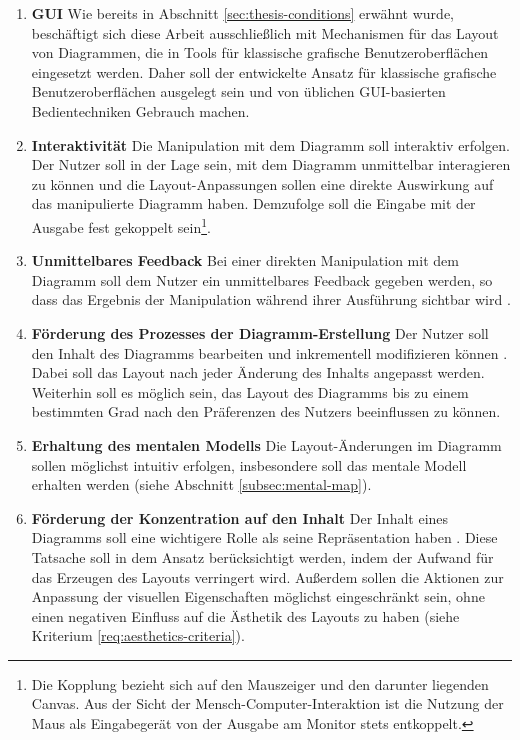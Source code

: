 \begin{enumerate}[label={K.\arabic*}]

\item
\label{req:gui}
\textbf{GUI}
Wie bereits in Abschnitt \ref{sec:thesis-conditions} erwähnt wurde, beschäftigt sich diese Arbeit ausschließlich mit Mechanismen für das Layout von Diagrammen, die in Tools für klassische grafische Benutzeroberflächen eingesetzt werden. Daher soll der entwickelte Ansatz für klassische grafische Benutzeroberflächen ausgelegt sein und von üblichen GUI-basierten Bedientechniken Gebrauch machen.

\item
\label{req:interactivity}
\textbf{Interaktivität}
Die Manipulation mit dem Diagramm soll interaktiv erfolgen. Der Nutzer soll in der Lage sein, mit dem Diagramm unmittelbar interagieren zu können und die Layout-Anpassungen sollen eine direkte Auswirkung auf das manipulierte Diagramm haben. Demzufolge soll die Eingabe mit der Ausgabe fest gekoppelt sein\footnote{Die Kopplung bezieht sich auf den Mauszeiger und den darunter liegenden Canvas. Aus der Sicht der Mensch-Computer-Interaktion ist die Nutzung der Maus als Eingabegerät von der Ausgabe am Monitor stets entkoppelt.}.

\item
\label{req:immediate-feedback}
\textbf{Unmittelbares Feedback}
Bei einer direkten Manipulation mit dem Diagramm soll dem Nutzer ein unmittelbares Feedback gegeben werden, so dass das Ergebnis der Manipulation während ihrer Ausführung sichtbar wird \cite[S.69]{Wybrow08Using}.

\item
\label{req:editing-support}
\textbf{Förderung des Prozesses der Diagramm-Erstellung}
Der Nutzer soll den Inhalt des Diagramms bearbeiten und inkrementell modifizieren können \cite{GladischSchumann14Semi-Automatic}. Dabei soll das Layout nach jeder Änderung des Inhalts angepasst werden. Weiterhin soll es möglich sein, das Layout des Diagramms bis zu einem bestimmten Grad nach den Präferenzen des Nutzers beeinflussen zu können.

\item
\label{req:mental-map}
\textbf{Erhaltung des mentalen Modells}
Die Layout-Änderungen im Diagramm sollen möglichst intuitiv erfolgen, insbesondere soll das mentale Modell erhalten werden (siehe Abschnitt \ref{subsec:mental-map}).


\item
\label{req:focus-on-the-content}
\textbf{Förderung der Konzentration auf den Inhalt}
Der Inhalt eines Diagramms soll eine wichtigere Rolle als seine Repräsentation haben \cite[S.38ff]{Ambler02Agile}. Diese Tatsache soll in dem Ansatz berücksichtigt werden, indem der Aufwand für das Erzeugen des Layouts verringert wird. Außerdem sollen die Aktionen zur Anpassung der visuellen Eigenschaften möglichst eingeschränkt sein, ohne einen negativen Einfluss auf die Ästhetik des Layouts zu haben (siehe Kriterium \ref{req:aesthetics-criteria}).


\end{enumerate}
